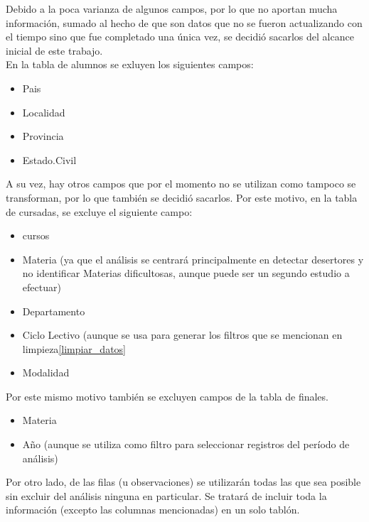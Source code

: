 
Debido a la poca varianza de algunos campos, por lo que no aportan mucha información, sumado al hecho de que son datos que no se fueron actualizando con el tiempo sino que fue completado una única vez, se decidió sacarlos del alcance inicial de este trabajo.\\

En la tabla de alumnos se exluyen los siguientes campos:
\begin{itemize}
\item Pais
\item Localidad
\item Provincia
\item Estado.Civil
\end{itemize}

A su vez, hay otros campos que por el momento no se utilizan como tampoco se transforman, por lo que también se decidió sacarlos.
Por este motivo, en la tabla de cursadas, se excluye el siguiente campo:
\begin{itemize}
	\item cursos
	\item Materia (ya que el análisis se centrará principalmente en detectar desertores y no identificar Materias dificultosas, aunque puede ser un segundo estudio a efectuar)
	\item Departamento
	\item Ciclo Lectivo (aunque se usa para generar los filtros que se mencionan en limpieza\ref{limpiar_datos}
	\item Modalidad
\end{itemize}

Por este mismo motivo también se excluyen campos de la tabla de finales.
\begin{itemize}
	\item Materia
	\item Año (aunque se utiliza como filtro para seleccionar registros del período de análisis)
\end{itemize}

Por otro lado, de las filas (u observaciones) se utilizarán todas las que sea posible sin excluir del análisis ninguna en particular. Se tratará de incluir toda la información (excepto las columnas mencionadas) en un solo tablón.

